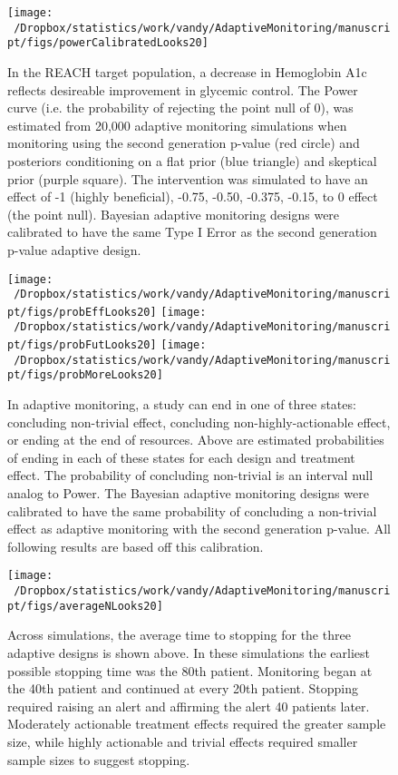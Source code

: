 \documentclass[12pt,oneside]{book}
\newlength{\li}\setlength{\li}{14.48pt}
\newlength{\di}\setlength{\di}{-3.5mm}
\theoremstyle{definition}
\theoremstyle{definition}
\theoremstyle{definition}
\theoremstyle{remark}
\begin{document}
\begin{figure}[H]

{\centering \texttt{[image: ~/Dropbox/statistics/work/vandy/AdaptiveMonitoring/manuscript/figs/powerCalibratedLooks20]} 

}

\caption{In the REACH target population, a decrease in Hemoglobin A1c reflects desireable improvement in glycemic control.  The Power curve (i.e. the probability of rejecting the point null of 0), was estimated from 20,000 adaptive monitoring simulations when monitoring using the second generation p-value (red circle) and posteriors conditioning on a flat prior (blue triangle) and skeptical prior (purple square).  The intervention was simulated to have an effect of -1 (highly beneficial), -0.75, -0.50, -0.375, -0.15, to 0 effect (the point null).  Bayesian adaptive monitoring designs were calibrated to have the same Type I Error as the second generation p-value adaptive design.}\label{fig:Power}
\end{figure}

\begin{figure}[H]

{\centering \texttt{[image: ~/Dropbox/statistics/work/vandy/AdaptiveMonitoring/manuscript/figs/probEffLooks20]} \texttt{[image: ~/Dropbox/statistics/work/vandy/AdaptiveMonitoring/manuscript/figs/probFutLooks20]} \texttt{[image: ~/Dropbox/statistics/work/vandy/AdaptiveMonitoring/manuscript/figs/probMoreLooks20]} 

}

\caption{In adaptive monitoring, a study can end in one of three states: concluding non-trivial effect, concluding non-highly-actionable effect, or ending at the end of resources.  Above are estimated probabilities of ending in each of these states for each design and treatment effect.  The probability of concluding non-trivial is an interval null analog to Power.  The Bayesian adaptive monitoring designs were calibrated to have the same probability of concluding a non-trivial effect as adaptive monitoring with the second generation p-value.  All following results are based off this calibration.}\label{fig:state}
\end{figure}

\begin{figure}[H]

{\centering \texttt{[image: ~/Dropbox/statistics/work/vandy/AdaptiveMonitoring/manuscript/figs/averageNLooks20]} 

}

\caption{Across  simulations, the average time to stopping for the three adaptive designs is shown above.  In these simulations the earliest possible stopping time was the 80th patient.  Monitoring began at the 40th patient and continued at every 20th patient.  Stopping required raising an alert and affirming the alert 40 patients later.  Moderately actionable treatment effects required the greater sample size, while highly actionable and trivial effects required smaller sample sizes to suggest stopping.}\label{fig:sampleSize}
\end{figure}
\end{document}
